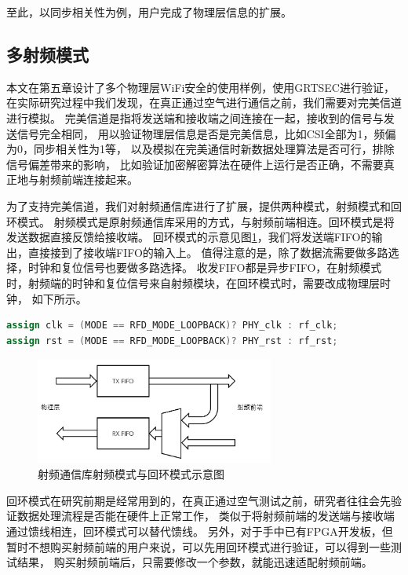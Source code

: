 		至此，以同步相关性为例，用户完成了物理层信息的扩展。

		\subsection{多射频模式}\label{subsec:grtsec_loopback}
		本文在第五章设计了多个物理层WiFi安全的使用样例，使用GRTSEC进行验证，
		在实际研究过程中我们发现，在真正通过空气进行通信之前，我们需要对完美信道进行模拟。
		完美信道是指将发送端和接收端之间连接在一起，接收到的信号与发送信号完全相同，
		用以验证物理层信息是否是完美信息，比如CSI全部为1，频偏为0，同步相关性为1等，
		以及模拟在完美通信时新数据处理算法是否可行，排除信号偏差带来的影响，
		比如验证加密解密算法在硬件上运行是否正确，不需要真正地与射频前端连接起来。

		为了支持完美信道，我们对射频通信库进行了扩展，提供两种模式，射频模式和回环模式。
		射频模式是原射频通信库采用的方式，与射频前端相连。回环模式是将发送数据直接反馈给接收端。
		回环模式的示意见图\ref{fig:rflib_loopback_mux}，我们将发送端FIFO的输出，直接接到了接收端FIFO的输入上。
		值得注意的是，除了数据流需要做多路选择，时钟和复位信号也要做多路选择。
		收发FIFO都是异步FIFO，在射频模式时，射频端的时钟和复位信号来自射频模块，在回环模式时，需要改成物理层时钟，
		如下所示。
		\begin{lstlisting}[language={Verilog}]
assign clk = (MODE == RFD_MODE_LOOPBACK)? PHY_clk : rf_clk;
assign rst = (MODE == RFD_MODE_LOOPBACK)? PHY_rst : rf_rst;
		\end{lstlisting}

			\begin{figure}
				\centering
				\includegraphics[width=0.7\textwidth]{img/rflib_loopback_mux.png}
				\caption{射频通信库射频模式与回环模式示意图}
				\label{fig:rflib_loopback_mux}
			\end{figure}

		回环模式在研究前期是经常用到的，在真正通过空气测试之前，研究者往往会先验证数据处理流程是否能在硬件上正常工作，
		类似于将射频前端的发送端与接收端通过馈线相连，回环模式可以替代馈线。
		另外，对于手中已有FPGA开发板，但暂时不想购买射频前端的用户来说，可以先用回环模式进行验证，可以得到一些测试结果，
		购买射频前端后，只需要修改一个参数，就能迅速适配射频前端。

